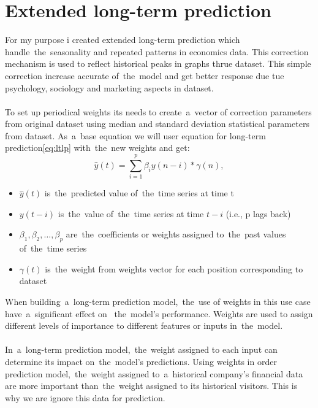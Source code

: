     \section{Extended long-term prediction}\label{sec:extlonglp}
    For my purpose i created extended long-term prediction which handle~the~seasonality and repeated patterns
    in economics data. This correction mechanism is used to reflect historical peaks in graphs thrue dataset.
    This simple correction increase accurate of~the~model and get better response due tue psychology,
    sociology and marketing aspects in dataset.\\
    \\
    To set up periodical weights its needs to create~a~vector of correction parameters from original dataset using
    median and standard deviation statistical parameters from dataset. As~a~base equation we will user equation
    for long-term prediction\ref{eq:ltlp} with~the~new weights and get:
    \begin{equation} \label{eq:eltlp}
        \hat{y}(t) = \sum_{i=1}^{p} \beta_i y(n-i) * \gamma(n),
    \end{equation}
    \begin{itemize}
        \item $\hat{y}(t)$ is~the~predicted value of~the~time series at time t
        \item $y(t-i)$ is~the~value of~the~time series at time $t-i$ (i.e., p lags back)
        \item $\beta_1, \beta_2, \dots, \beta_p$ are~the~coefficients or weights assigned to~the~past values of~the~time series
        \item $\gamma(t)$ is~the~weight from weights vector for each position corresponding to dataset
    \end{itemize}
    When building~a~long-term prediction model,~the~use of weights in this use case have~a~significant effect on
   ~the~model's performance. Weights are used to assign different levels of importance to different
    features or inputs in~the~model.\\
    \\
    In~a~long-term prediction model,~the~weight assigned to each input can determine its impact on~the~model's predictions.
    Using weights in order prediction model,~the~weight assigned to~a~historical company's financial data are more important
    than~the~weight assigned to its historical visitors. This is why we are ignore this data for prediction.\\
